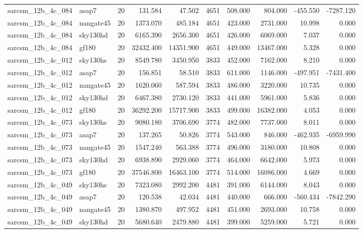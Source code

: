 \documentclass{article}
\begin{document}
\begin{longtable}{llrrrrrrrr}
sarcsm\_12b\_4c\_084 & asap7 & 20 & 131.584 & 47.502 & 4651 & 508.000 & 804.000 & -455.550 & -7287.120 \\
sarcsm\_12b\_4c\_084 & nangate45 & 20 & 1373.070 & 485.184 & 4651 & 423.000 & 2731.000 & 10.998 & 0.000 \\
sarcsm\_12b\_4c\_084 & sky130hd & 20 & 6165.390 & 2656.300 & 4651 & 426.000 & 6069.000 & 7.037 & 0.000 \\
sarcsm\_12b\_4c\_084 & gf180 & 20 & 32432.400 & 14351.900 & 4651 & 449.000 & 13467.000 & 5.328 & 0.000 \\
sarcsm\_12b\_4c\_012 & sky130hs & 20 & 8549.780 & 3450.950 & 3833 & 452.000 & 7162.000 & 8.210 & 0.000 \\
sarcsm\_12b\_4c\_012 & asap7 & 20 & 156.851 & 58.510 & 3833 & 611.000 & 1146.000 & -497.951 & -7431.400 \\
sarcsm\_12b\_4c\_012 & nangate45 & 20 & 1620.060 & 587.594 & 3833 & 486.000 & 3220.000 & 10.735 & 0.000 \\
sarcsm\_12b\_4c\_012 & sky130hd & 20 & 6467.380 & 2730.120 & 3833 & 441.000 & 5961.000 & 5.836 & 0.000 \\
sarcsm\_12b\_4c\_012 & gf180 & 20 & 36292.200 & 15717.900 & 3833 & 499.000 & 16382.000 & 4.053 & 0.000 \\
sarcsm\_12b\_4c\_073 & sky130hs & 20 & 9080.180 & 3706.690 & 3774 & 482.000 & 7737.000 & 8.011 & 0.000 \\
sarcsm\_12b\_4c\_073 & asap7 & 20 & 137.265 & 50.826 & 3774 & 543.000 & 846.000 & -462.935 & -6959.990 \\
sarcsm\_12b\_4c\_073 & nangate45 & 20 & 1547.240 & 563.388 & 3774 & 496.000 & 3180.000 & 10.808 & 0.000 \\
sarcsm\_12b\_4c\_073 & sky130hd & 20 & 6938.890 & 2929.060 & 3774 & 464.000 & 6642.000 & 5.973 & 0.000 \\
sarcsm\_12b\_4c\_073 & gf180 & 20 & 37546.800 & 16463.100 & 3774 & 514.000 & 16086.000 & 4.669 & 0.000 \\
sarcsm\_12b\_4c\_049 & sky130hs & 20 & 7323.080 & 2992.200 & 4481 & 391.000 & 6144.000 & 8.043 & 0.000 \\
sarcsm\_12b\_4c\_049 & asap7 & 20 & 120.538 & 42.034 & 4481 & 440.000 & 666.000 & -560.434 & -7842.290 \\
sarcsm\_12b\_4c\_049 & nangate45 & 20 & 1380.870 & 497.952 & 4481 & 451.000 & 2693.000 & 10.758 & 0.000 \\
sarcsm\_12b\_4c\_049 & sky130hd & 20 & 5680.640 & 2479.880 & 4481 & 399.000 & 5259.000 & 5.721 & 0.000 \\

\end{longtable}
\end{document}
